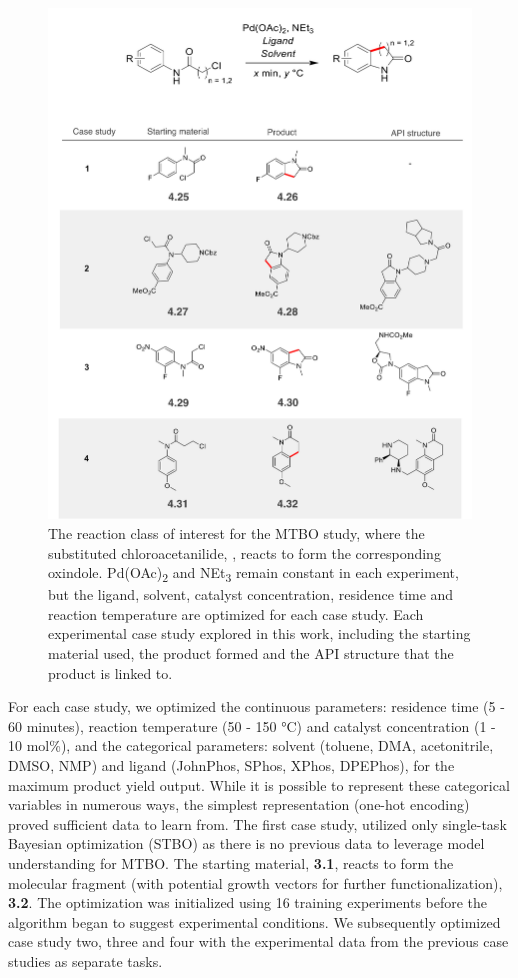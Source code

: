 \begin{figure}
    \centering
    \includegraphics[width=\textwidth]{gfx/Chapter04/ch_activation_case_studies.png}
    \caption{ The reaction class of interest for the MTBO study, where the substituted chloroacetanilide, , reacts to form the corresponding oxindole. Pd(OAc)\textsubscript{2} and NEt\textsubscript{3} remain constant in each experiment, but the ligand, solvent, catalyst concentration, residence time and reaction temperature are optimized for each case study. Each experimental case study explored in this work, including the starting material used, the product formed and the API structure that the product is linked to.}
    \label{fig:ch_activation}
\end{figure}

For each case study, we optimized the continuous parameters: residence time (5 - 60 minutes), reaction temperature (50 - 150 °C) and catalyst concentration (1 - 10 mol\%), and the categorical parameters: solvent (toluene, DMA, acetonitrile, DMSO, NMP) and ligand (JohnPhos, SPhos, XPhos, DPEPhos), for the maximum product yield output. While it is possible to represent these categorical variables in numerous ways, the simplest representation (one-hot encoding) proved sufficient data to learn from. The first case study, utilized only single-task Bayesian optimization (STBO) as there is no previous data to leverage model understanding for MTBO. The starting material, \textbf{3.1}, reacts to form the molecular fragment (with potential growth vectors for further functionalization), \textbf{3.2}. The optimization was initialized using 16 training experiments before the algorithm began to suggest experimental conditions. We subsequently optimized case study two, three and four with the experimental data from the previous case studies as separate tasks.

